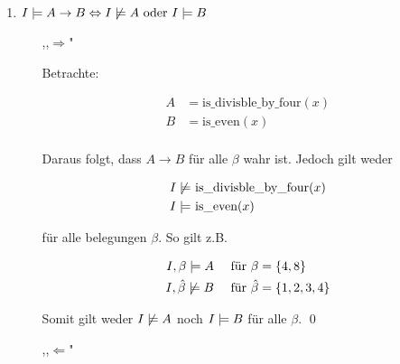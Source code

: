 

\date{Donnerstag 07.11.2019}


\maketitle
\thispagestyle{fancy}


\begin{enumerate}
	\item $I \models A \to B \Leftrightarrow I \not\models A \text{ oder } I \models B$

	\begin{enumerate}
		
		\item[,,$\Rightarrow$"]
		
		Betrachte:		
		
		\begin{align*}
				A &= \text{is\_divisble\_by\_four}(x) \\
				B &= \text{is\_even}(x) \\ 
		\end{align*}
		
		Daraus folgt, dass $A\to B$ für alle $\beta$ wahr ist. Jedoch gilt weder
		
		\begin{align*}
				I \not\models & \text{ is\_divisble\_by\_four}(x) \\
				I \models & \text{ is\_even}(x) \\ 
		\end{align*}
		
		für alle belegungen $\beta$. So gilt z.B. 
		
		\begin{align*}
				I, \beta \models A & & \text{ für } \beta & = \{4,8\} 	 \\
				I,\hat\beta \not\models B & & \text{ für } \hat\beta & =\{1,2,3,4\} 
		\end{align*}
		
		
		Somit gilt weder $I\not\models A$ noch $I\models B$ für alle $\beta$. \qed
		
		
		\item[,,$\Leftarrow$"]
		

\end{enumerate}
\end{enumerate}

